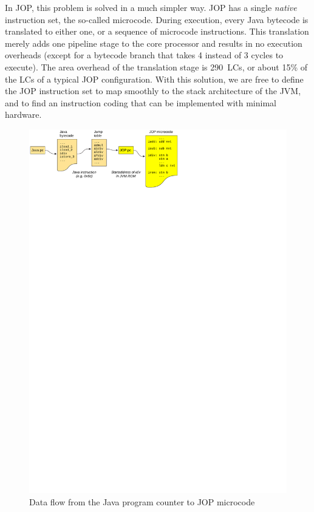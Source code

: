 In JOP, this problem is solved in a much simpler way. JOP has a
single \emph{native} instruction set, the so-called microcode.
During execution, every Java bytecode is translated to either one,
or a sequence of microcode instructions. This translation merely
adds one pipeline stage to the core processor and results in no
execution overheads (except for a bytecode branch that takes 4
instead of 3 cycles to execute). The area overhead of the
translation stage is 290~LCs, or about 15\% of the LCs of a typical
JOP configuration. With this solution, we are free to define the JOP
instruction set to map smoothly to the stack architecture of the
JVM, and to find an instruction coding that can be implemented with
minimal hardware.

\begin{figure}
    \centering
    \includegraphics[scale=\picscale]{arch/arch_indirection}
    \caption{Data flow from the Java program counter to JOP microcode}
    \label{fig_arch_data_flow}
\end{figure}


